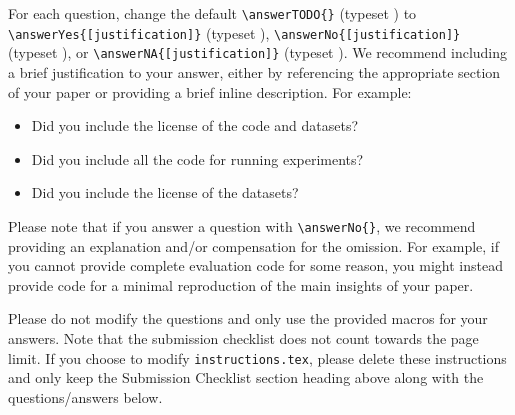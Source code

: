 \documentclass[11pt]{article}
\begin{document}
For each question, change the default \verb|\answerTODO{}| (typeset \answerTODO)
to
\verb|\answerYes{[justification]}| (typeset \answerYes),
\verb|\answerNo{[justification]}| (typeset \answerNo), or
\verb|\answerNA{[justification]}| (typeset \answerNA).
We recommend including a brief justification to your answer, either by
referencing the appropriate section of your paper or providing a brief inline
description.  For example:
\begin{itemize}
\item Did you include the license of the code and datasets? 
\item Did you include all the code for running experiments? 
\item Did you include the license of the datasets? 
\end{itemize}
Please note that if you answer a question with \verb|\answerNo{}|, we recommend
providing an explanation and/or compensation for the omission. For example, if
you cannot provide complete evaluation code for some reason, you might instead
provide code for a minimal reproduction of the main insights of your paper.

Please do not modify the questions and only use the provided macros for your
answers. Note that the submission checklist does not count towards the page
limit. If you choose to modify \texttt{instructions.tex}, please delete these
instructions and only keep the Submission Checklist section heading above along
with the questions/answers below.
\end{document}
